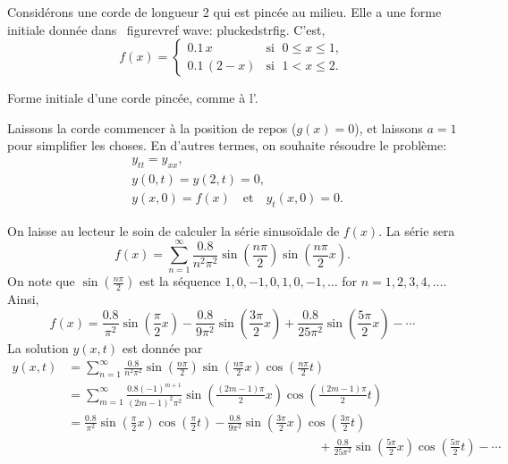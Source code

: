\begin{example} \label{example:pluckedstring}
Considérons une corde de longueur 2 qui est pincée au milieu.
Elle a une forme initiale donnée dans \ figurevref {wave: pluckedstrfig}.
C'est,
\begin{equation*}
f(x) = \begin{cases}
0.1\, x & \text{si } \; 0 \leq x \leq 1 , \\
0.1\, (2-x) & \text{si } \; 1 < x \leq 2 .
\end{cases}
\end{equation*}

\begin{myfig}
\capstart
{}
\caption{Forme initiale d'une corde pincée, comme à 
l'.\label{wave:pluckedstrfig}}
\end{myfig}

Laissons la corde commencer à la position de repos ($g(x) =
0$), et laissons $a=1$ pour simplifier les choses.  En d'autres termes,  on souhaite
résoudre le problème:
\begin{align*}
& y_{tt} = y_{xx}, \\
& y(0,t) = y(2,t)= 0 , \\
& y(x,0) = f(x) \quad \text{et} \quad y_t(x,0)= 0 .
\end{align*}

On laisse au lecteur le soin de calculer la série sinusoïdale de $ f (x) $.  La série
sera
\begin{equation*}
f(x) = \sum_{n=1}^\infty
\frac{0.8}{n^2 \pi^2}
\sin \left( \frac{n \pi}{2} \right)
\sin \left( \frac{n \pi}{2} x \right) .
\end{equation*}
On note que
$\sin \left( \frac{n \pi}{2} \right)$
est la séquence $1, 0, -1, 0, 1, 0, -1, \ldots$
for $n = 1,2,3,4,\ldots$.  Ainsi,
\begin{equation*}
f(x) = 
\frac{0.8}{\pi^2}
\sin \left( \frac{\pi}{2} x \right)
-
\frac{0.8}{9 \pi^2}
\sin \left( \frac{3 \pi}{2} x \right)
+
\frac{0.8}{25 \pi^2}
\sin \left( \frac{5 \pi}{2} x \right)
- \cdots
\end{equation*}
La solution $y(x,t)$ est donnée par
\begin{equation*}
\begin{split}
y(x,t) & = 
\sum_{n=1}^\infty
\frac{0.8}{n^2 \pi^2}
\sin \left( \frac{n \pi}{2} \right)
\sin \left( \frac{n \pi}{2} x \right)
\cos \left( \frac{n \pi}{2} t \right)
\\
& = 
\sum_{m=1}^\infty
\frac{0.8 {(-1)}^{m+1}}{{(2m-1)}^2 \pi^2}
\sin \left( \frac{(2m-1) \pi}{2} x \right)
\cos \left( \frac{(2m-1) \pi}{2} t \right)
\\
& =
\frac{0.8}{\pi^2} 
\sin \left( \frac{\pi}{2}  x \right)
\cos \left( \frac{\pi}{2}  t \right)
-
\frac{0.8}{9 \pi^2} 
\sin \left( \frac{3 \pi}{2}  x \right)
\cos \left( \frac{3 \pi}{2}  t \right)
\\
& \hspace{20em}
+
\frac{0.8}{25 \pi^2}
\sin \left( \frac{5 \pi}{2}  x \right)
\cos \left( \frac{5 \pi}{2}  t \right) 
- \cdots
\end{split}
\end{equation*}


\end{example}
